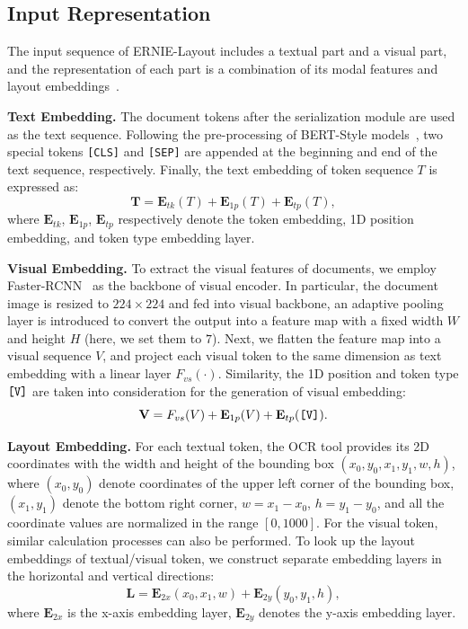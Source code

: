 \documentclass[11pt]{article}
\begin{document}
\subsection{Input Representation}

The input sequence of ERNIE-Layout includes a textual part and a visual part, and the representation of each part is a combination of its modal features and layout embeddings~\cite{xu2021layoutlmv2}.

\noindent\textbf{Text Embedding.}
The document tokens after the serialization module are used as the text sequence. 
Following the pre-processing of BERT-Style models~\cite{devlin2019bert}, two special tokens \verb|[CLS]| and \verb|[SEP]| are appended at the beginning and end of the text sequence, respectively. 
Finally, the text embedding of token sequence $T$ is expressed as:
%
\begin{equation}
    \textbf{T}= \textbf{E}_{tk}(T) + \textbf{E}_{1p}(T) + \textbf{E}_{tp}(T),
\end{equation}
%
where $\textbf{E}_{tk}$, $\textbf{E}_{1p}$, $\textbf{E}_{tp}$ respectively denote the token embedding, 1D position embedding, and token type embedding layer. 


\noindent\textbf{Visual Embedding.}
To extract the visual features of documents, we employ Faster-RCNN~\cite{ren2015faster} as the backbone of visual encoder.
In particular, the document image is resized to $224 \times 224$ and fed into visual backbone, an adaptive pooling layer is introduced to convert the output into a feature map with a fixed width $W$ and height $H$ (here, we set them to $7$).
Next, we flatten the feature map into a visual sequence $V$, and project each visual token to the same dimension as text embedding with a linear layer $F_{vs}(\cdot)$. 
Similarity, the 1D position and token type $\verb|[V]|$ are taken into consideration for the generation of visual embedding:
\begin{equation}
    \textbf{V}= F_{vs}(V) + \textbf{E}_{1p}(V) + \textbf{E}_{tp}(\verb|[V]|).
\end{equation}

\noindent\textbf{Layout Embedding.}
For each textual token, the OCR tool provides its 2D  coordinates with the width and height of the bounding box $(x_0, y_0, x_1, y_1, w, h)$,
where $(x_0, y_0)$ denote coordinates of the upper left corner of the bounding box, $(x_1, y_1)$ denote the bottom right corner, $w = x_1 - x_0$, $h = y_1 - y_0$, and all the coordinate values are normalized in the range $[0, 1000]$.
For the visual token, similar calculation processes can also be performed.
To look up the layout embeddings of textual/visual token, we construct separate embedding layers in the horizontal and vertical directions:
% 
\begin{equation}
\textbf{L} = \textbf{E}_{2x}(x_0 ,x_1, w) + \textbf{E}_{2y}(y_0, y_1, h),
\end{equation}
where $\textbf{E}_{2x}$ is the x-axis embedding layer, $\textbf{E}_{2y}$ denotes the y-axis embedding layer.
\end{document}
